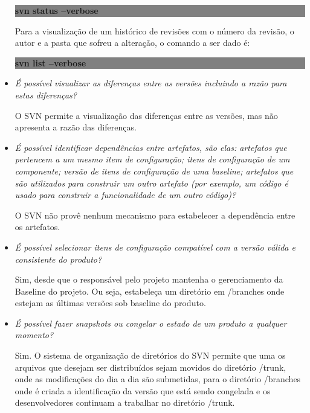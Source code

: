 \begin{itemize}
    \begin{centering}
    \colorbox{Gray}{
    \begin{minipage}{120px}
      \textbf{svn status --verbose}
    \end{minipage}
    }

    \end{centering}

    Para a visualização de um histórico de revisões com o número da revisão, o autor e a pasta que sofreu a alteração, o comando a ser dado é:

     \begin{centering}
    \colorbox{Gray}{
    \begin{minipage}{120px}
      \textbf{svn list --verbose}
    \end{minipage}
    }

    \end{centering}

  \item \textit{É possível visualizar as diferenças entre as versões incluindo a razão para estas
  diferenças?}

      O SVN permite a visualização das diferenças entre as versões, mas não apresenta a razão das diferenças.

  \item \textit{É possível identificar dependências entre artefatos, são elas: artefatos que pertencem a um mesmo item de configuração; itens de configuração de um componente; versão de itens de configuração de uma baseline; artefatos que são utilizados para construir um outro artefato  (por exemplo, um código é usado para construir a funcionalidade de um outro código)?}

        O SVN não provê nenhum mecanismo para estabelecer a dependência entre os artefatos.

  \item \textit{É possível selecionar itens de configuração compatível com a versão válida e consistente do
  produto?}

      Sim, desde que o responsável pelo projeto mantenha o gerenciamento da Baseline do projeto. Ou seja, estabeleça um diretório em /branches onde estejam as últimas versões sob baseline do produto.

  \item \textit{É possível fazer snapshots ou congelar o estado de um produto a qualquer momento?}

      Sim. O sistema de organização de diretórios do SVN permite que uma os arquivos que desejam ser distribuídos sejam movidos do diretório /trunk, onde as modificações do dia a dia são submetidas, para  o diretório /branches onde é criada a identificação da versão que está sendo congelada e os desenvolvedores continuam a trabalhar no diretório /trunk.


\end{itemize}
